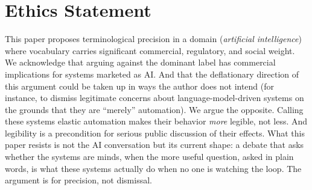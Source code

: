 \documentclass[11pt,a4paper]{article}
\begin{document}
\section*{Ethics Statement}

This paper proposes terminological precision in a domain (\textit{artificial intelligence}) where vocabulary carries significant commercial, regulatory, and social weight. We acknowledge that arguing against the dominant label has commercial implications for systems marketed as AI. And that the deflationary direction of this argument could be taken up in ways the author does not intend (for instance, to dismiss legitimate concerns about language-model-driven systems on the grounds that they are ``merely'' automation). We argue the opposite. Calling these systems elastic automation makes their behavior \textit{more} legible, not less. And legibility is a precondition for serious public discussion of their effects. What this paper resists is not the AI conversation but its current shape: a debate that asks whether the systems are minds, when the more useful question, asked in plain words, is what these systems actually do when no one is watching the loop. The argument is for precision, not dismissal.



\end{document}
